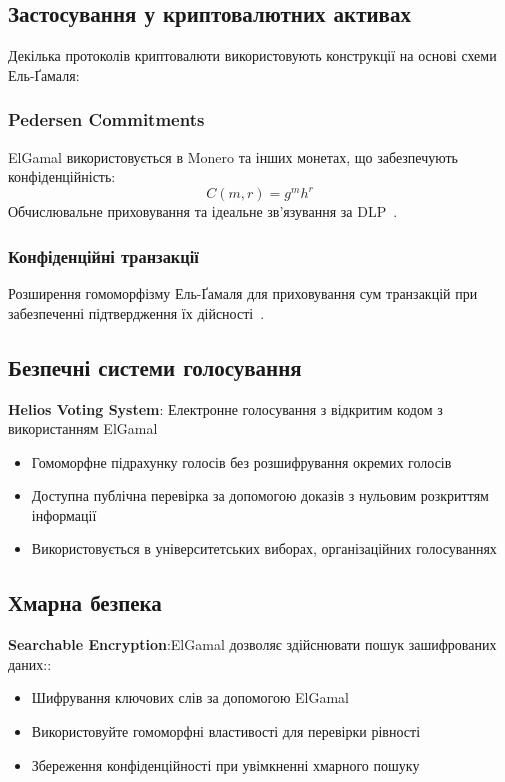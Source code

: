 \subsection{Застосування у криптовалютних активах}

Декілька протоколів криптовалюти використовують конструкції на основі схеми Ель-Ґамаля:

\subsubsection{Pedersen Commitments}
ElGamal використовується в Monero та інших монетах, що забезпечують конфіденційність:
\begin{equation*}
    C(m, r) = g^m h^r
\end{equation*}
Обчислювальне приховування та ідеальне зв'язування за DLP~\cite{pedersen1991non}.

\subsubsection{Конфіденційні транзакції}
Розширення гомоморфізму Ель-Ґамаля для приховування сум транзакцій при забезпеченні підтвердження їх дійсності~\cite{maxwell2016confidential}.

\subsection{Безпечні системи голосування}

\textbf{Helios Voting System}: Електронне голосування з відкритим кодом з використанням ElGamal~\cite{adida2008helios}
\begin{itemize}
    \item Гомоморфне підрахунку голосів без розшифрування окремих голосів
    \item Доступна публічна перевірка за допомогою доказів з нульовим розкриттям інформації
    \item Використовується в університетських виборах, організаційних голосуваннях
\end{itemize}

\subsection{Хмарна безпека}

\textbf{Searchable Encryption}:ElGamal дозволяє здійснювати пошук зашифрованих даних::
\begin{itemize}
    \item Шифрування ключових слів за допомогою ElGamal
    \item Використовуйте гомоморфні властивості для перевірки рівності
    \item Збереження конфіденційності при увімкненні хмарного пошуку~\cite{boneh2004public}
\end{itemize}

